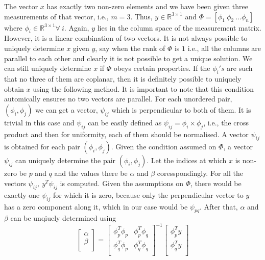 \documentclass{article}
\begin{document}
The vector $x$ has exactly two non-zero elements and we have been given three measurements of that vector, i.e., $ m = 3 $. Thus, $ y \in \mathbb{R}^{3 \times 1} $ and $ \Phi = [ \phi_1 \ \phi_2 \ \dots \phi_n] $ where $ \phi_i \in \mathbb{R}^{3 \times 1} \forall \ i $. Again, $y$ lies in the column space of the measurement matrix. However, it is a linear combination of two vectors. It is not always possible to uniquely determine $x$ given $y$, say when the rank of $\Phi$ is $1$ i.e., all the columns are parallel to each other and clearly it is not possible to get a unique solution. We can still uniquely determine $x$ if $\Phi$ obeys certain properties. If the $\phi_i 's$ are such that no three of them are coplanar, then it is definitely possible to uniquely obtain $x$ using the following method. It is important to note that this condition automically ensures no two vectors are parallel. For each unordered pair, $ (\phi_i , \phi_j) $ we can get a vector, $\psi_{ij} $ which is perpendicular to both of them. It is trivial in this case and $\psi_{ij}$ can be easily defined as $ \psi_{ij} = \phi_i \times \phi_j $, i.e., the cross product and then for uniformity, each of them should be normalised. A vector $\psi_{ij}$ is obtained for each pair $ (\phi_i , \phi_j) $. Given the condition assumed on $\Phi$, a vector $\psi_{ij}$ can uniquely determine the pair $ (\phi_i , \phi_j) $. Let the indices at which $x$ is non-zero be $p$ and $q$ and the values there be $\alpha$ and $\beta$ coresspondingly. For all the vectors $\psi_{ij},\  y^T \psi_{ij}$ is computed. Given the assumptions on $\Phi$, there would be exactly one $\psi_{ij}$ for which it is zero, because only the perpendicular vector to $y$ has a zero component along it, which in our case would be $\psi_{pq}$. After that, $\alpha$ and $\beta$ can be unqiuely determined using 
$$ \begin{bmatrix} \alpha \\  \beta \\ \end {bmatrix} = \begin{bmatrix} \phi_p^T \phi_p & \phi_p^T \phi_q \\ \phi_q^T \phi_p & \phi_q^T \phi_q \\ \end{bmatrix}^{-1} \begin{bmatrix} \phi_p^T y \\ \phi_q^T y \\ \end{bmatrix} $$ 
\end{document}
